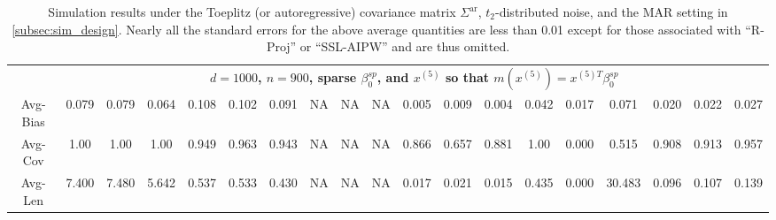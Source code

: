 \documentclass[ejsv2,noshowframe]{imsart}
\theoremstyle{plain}
\theoremstyle{definition}
\theoremstyle{remark}
\begin{document}
\begin{table}[hbtp!]
\begin{center}
{\begin{tabular}{ccccccccccccccccccc}
		& \multicolumn{18}{c}{\bf $d=1000$, $n = 900$, sparse $\beta_0^{sp}$, and $x^{(5)}$ so that $m(x^{(5)})=x^{(5)T}\beta_0^{sp}$} \\ \cline{2-19}
		Avg-Bias & 0.079 & 0.079 & 0.064 & 0.108 & 0.102 & 0.091 & NA & NA & NA & 0.005 & 0.009 & 0.004 & 0.042 & 0.017 & 0.071 & 0.020 & 0.022 & 0.027 \\
		Avg-Cov & 1.00 & 1.00 & 1.00 & 0.949 & 0.963 & 0.943 & NA & NA & NA & 0.866 & 0.657 & 0.881 & 1.00 & 0.000 & 0.515 & 0.908 & 0.913 & 0.957 \\
		Avg-Len & 7.400 & 7.480 & 5.642 & 0.537 & 0.533 & 0.430 & NA & NA & NA & 0.017 & 0.021 & 0.015 & 0.435 & 0.000 & 30.483 & 0.096 & 0.107 & 0.139 \\
		\hline\hline
\end{tabular}}
\caption{Simulation results under the Toeplitz (or autoregressive) covariance matrix $\Sigma^{\mathrm{ar}}$, $t_2$-distributed noise, and the MAR setting in \autoref{subsec:sim_design}. Nearly all the standard errors for the above average quantities are less than 0.01 except for those associated with ``R-Proj'' or ``SSL-AIPW'' and are thus omitted.}
\label{table:AR_MAR_terr_res}
\end{center}
\end{table}
\end{document}
